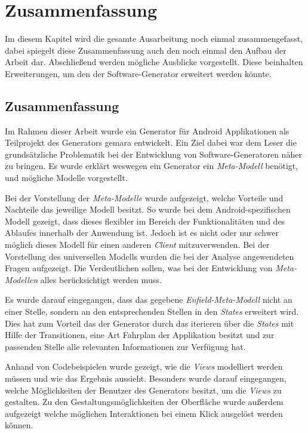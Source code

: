 \chapter{Zusammenfassung}
Im diesem Kapitel wird die gesamte Ausarbeitung noch einmal zusammengefasst, dabei spiegelt diese Zusammenfassung auch den noch einmal den Aufbau der Arbeit dar. Abschließend werden mögliche Ausblicke vorgestellt. Diese beinhalten Erweiterungen, um den der Software-Generator erweitert werden könnte.

\section{Zusammenfassung}
Im Rahmen dieser Arbeit wurde ein Generator für Android Applikationen als Teilprojekt des Generators \acf{gemara} entwickelt.
Ein Ziel dabei war dem Leser die grundsätzliche Problematik bei der Entwicklung von Software-Generatoren näher zu bringen.
Es wurde erklärt weswegen ein Generator ein \textit{Meta-Modell} benötigt, und mögliche Modelle vorgestellt. 

Bei der Vorstellung der \textit{Meta-Modelle} wurde aufgezeigt, welche Vorteile und Nachteile das jeweilige Modell besitzt. So wurde bei dem Android-spezifischen Modell gezeigt, dass dieses flexibler im Bereich der Funktionalitäten und des Ablaufes innerhalb der Anwendung ist. Jedoch ist es nicht oder nur schwer möglich dieses Modell für einen anderen \textit{Client} mitzuverwenden. Bei der Vorstellung des universellen Modells wurden die bei der Analyse angewendeten Fragen aufgezeigt. Die Verdeutlichen sollen, was bei der Entwicklung von \textit{Meta-Modellen} alles berücksichtigt werden muss.

Es wurde darauf eingegangen, dass das gegebene \textit{Enfield-Meta-Modell} nicht an einer Stelle, sondern an den entsprechenden Stellen in den \textit{States} erweitert wird. Dies hat zum Vorteil das der Generator durch das iterieren über die \textit{States} mit Hilfe der Transitionen, eine Art Fahrplan der Applikation besitzt und zur passenden Stelle alle relevanten Informationen zur Verfügung hat.

Anhand von Codebeispielen wurde gezeigt, wie die \textit{Views} modelliert werden müssen und wie das Ergebnis aussieht. Besonders wurde darauf eingegangen, welche Möglichkeiten der Benutzer des Generators besitzt, um die \textit{Views} zu gestalten. Zu den Gestaltungsmöglichkeiten der Oberfläche wurde außerdem aufgezeigt welche möglichen Interaktionen bei einem Klick ausgelöst werden können.

